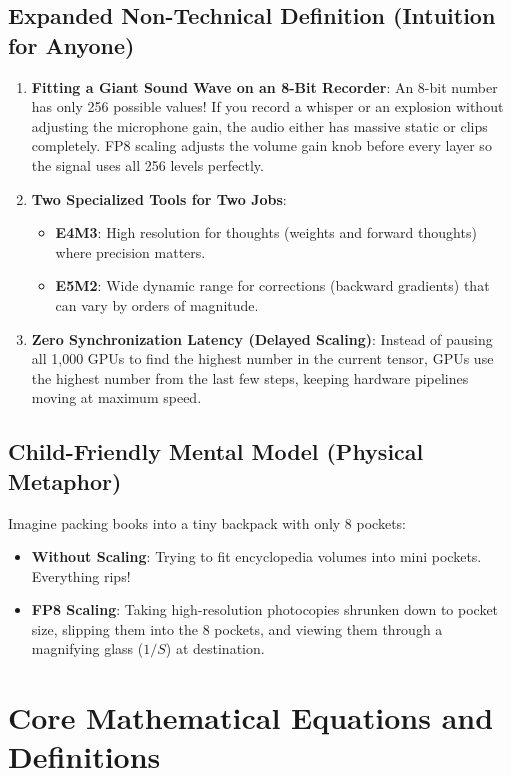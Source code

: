 \documentclass[11pt,a4paper]{article}
\theoremstyle{definition}
\begin{document}
\subsection{Expanded Non-Technical Definition (Intuition for Anyone)}
\begin{enumerate}
    \item \textbf{Fitting a Giant Sound Wave on an 8-Bit Recorder}: An 8-bit number has only 256 possible values! If you record a whisper or an explosion without adjusting the microphone gain, the audio either has massive static or clips completely. FP8 scaling adjusts the volume gain knob before every layer so the signal uses all 256 levels perfectly.
    \item \textbf{Two Specialized Tools for Two Jobs}:
    \begin{itemize}
        \item \textbf{E4M3}: High resolution for thoughts (weights and forward thoughts) where precision matters.
        \item \textbf{E5M2}: Wide dynamic range for corrections (backward gradients) that can vary by orders of magnitude.
    \end{itemize}
    \item \textbf{Zero Synchronization Latency (Delayed Scaling)}: Instead of pausing all 1,000 GPUs to find the highest number in the current tensor, GPUs use the highest number from the last few steps, keeping hardware pipelines moving at maximum speed.
\end{enumerate}

\subsection{Child-Friendly Mental Model (Physical Metaphor)}
Imagine packing books into a tiny backpack with only 8 pockets:
\begin{itemize}
    \item \textbf{Without Scaling}: Trying to fit encyclopedia volumes into mini pockets. Everything rips!
    \item \textbf{FP8 Scaling}: Taking high-resolution photocopies shrunken down to pocket size, slipping them into the 8 pockets, and viewing them through a magnifying glass ($1/S$) at destination.
\end{itemize}

\section{Core Mathematical Equations and Definitions}
\end{document}
